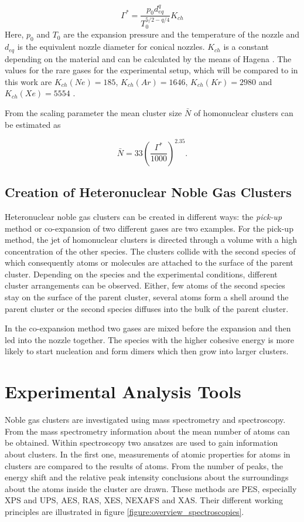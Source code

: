 \begin{equation}
 \Gamma^* = \frac{p_0 d_{eq}^q}{T_0^{5/2-q/4}} K_{ch}
\end{equation}
Here, $p_0$ and $T_0$ are the expansion pressure and the temperature
of the nozzle and $d_{eq}$ is the equivalent nozzle diameter for conical
nozzles. $K_{ch}$ is a constant depending on the material and can be
calculated by the means of Hagena \cite{Hagena87}. The values for the rare gases for
the experimental setup, which will be compared to in this work are
$K_{ch}(Ne)=185$, $K_{ch}(Ar)=1646$, $K_{ch}(Kr)=2980$ and $K_{ch}(Xe)=5554$
\cite{PhDFoerstel}.

From the scaling parameter the mean cluster size $\bar{N}$ 
of homonuclear clusters can be
estimated as

\begin{equation}
  \bar{N} = 33 \left( \frac{\Gamma^*}{1000} \right) ^{2.35} .
\end{equation}


\subsection{Creation of Heteronuclear Noble Gas Clusters}
Heteronuclear noble gas clusters can be created in different ways:
the \emph{pick-up} method or co-expansion of two different gases are two examples.
For the pick-up method, the jet of homonuclear clusters is directed through
a volume with a high concentration of the other species. The clusters
collide with the second species of which consequently atoms or molecules
are attached to the surface
of the parent cluster. Depending on the species
and the experimental conditions, different cluster arrangements can be observed.
Either, few atoms
of the second species stay on the surface of the parent cluster,
several atoms form a shell around the parent cluster or the second species
diffuses into the bulk of the parent cluster.

In the co-expansion method two gases are mixed before the expansion and
then led into the nozzle together. The species with the higher cohesive
energy is more likely to start nucleation and form dimers which
then grow into larger clusters.



\section{Experimental Analysis Tools}
Noble gas clusters are investigated using mass spectrometry and spectroscopy.
From the mass spectrometry information about the mean number of atoms
can be obtained. Within spectroscopy two ansatzes are used
to gain information about clusters. In the first one, measurements of
atomic properties for atoms in clusters are compared to the results of
atoms. From the number of peaks, the energy shift and the relative peak
intensity conclusions about the surroundings about the atoms inside
the cluster are drawn. These methods are \ac{PES}, especially \ac{XPS}
and \ac{UPS}, \ac{AES}, \ac{RAS}, \ac{XES}, \ac{NEXAFS} and \ac{XAS}.
Their different working principles are illustrated in figure
\ref{figure:overview_spectroscopies}.

